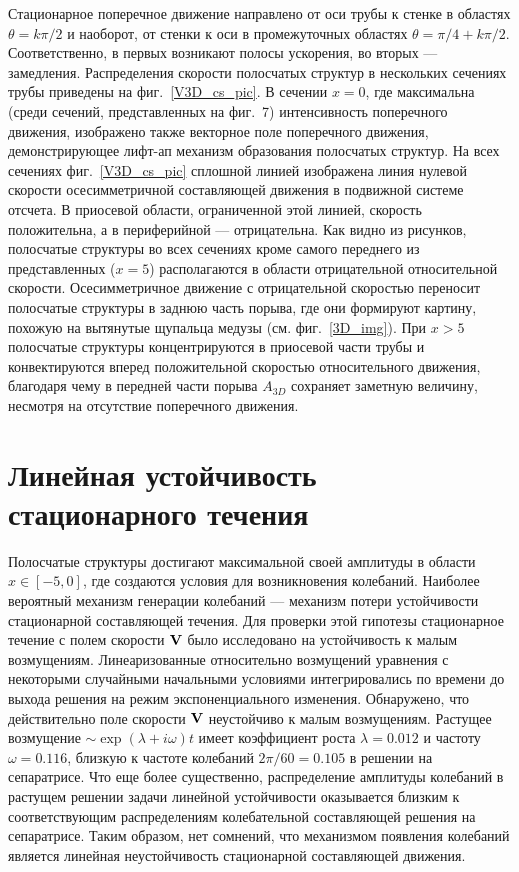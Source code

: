 Стационарное поперечное движение направлено от оси трубы к стенке в областях $\theta=k\pi/2$ и наоборот, от стенки к оси в промежуточных областях $\theta=\pi/4+k\pi/2$. Соответственно, в первых возникают полосы ускорения, во вторых --- замедления. Распределения скорости полосчатых структур в нескольких сечениях трубы приведены на фиг.~\ref{V3D_cs_pic}. В сечении $x=0$, где максимальна (среди сечений, представленных на фиг.~7) интенсивность поперечного движения, изображено также векторное поле поперечного движения, демонстрирующее лифт-ап механизм образования полосчатых структур. На всех сечениях фиг.~\ref{V3D_cs_pic} сплошной линией изображена линия нулевой скорости осесимметричной составляющей движения в подвижной системе отсчета. В приосевой области, ограниченной этой линией, скорость положительна, а в периферийной --- отрицательна. Как видно из рисунков, полосчатые структуры во всех сечениях кроме самого переднего из представленных ($x=5$) располагаются в области отрицательной относительной скорости. Осесимметричное движение с отрицательной скоростью переносит полосчатые структуры в заднюю часть порыва, где они формируют картину, похожую на вытянутые щупальца медузы (см. фиг.~\ref{3D_img}). При $x>5$ полосчатые структуры концентрируются в приосевой части трубы и конвектируются вперед положительной скоростью относительного движения, благодаря чему в передней части порыва $A_{3D}$ сохраняет заметную величину, несмотря на отсутствие поперечного движения.


\section{Линейная устойчивость стационарного течения}

Полосчатые структуры достигают максимальной своей амплитуды в области $x\in[-5,0]$, где создаются условия для возникновения колебаний. Наиболее вероятный механизм генерации колебаний --- механизм потери устойчивости стационарной составляющей течения. Для проверки этой гипотезы стационарное течение с полем скорости $\mathbf{V}$ было исследовано на устойчивость к малым возмущениям. Линеаризованные относительно возмущений уравнения с некоторыми случайными начальными условиями интегрировались по времени до выхода решения на режим экспоненциального изменения. Обнаружено, что действительно поле скорости $\mathbf{V}$ неустойчиво к малым возмущениям. Растущее возмущение $\sim\exp(\lambda+i\omega)t$ имеет коэффициент роста $\lambda=0.012$ и частоту $\omega=0.116$, близкую к частоте колебаний $2\pi/60=0.105$ в решении на сепаратрисе. Что еще более существенно, распределение амплитуды колебаний в растущем решении задачи линейной устойчивости оказывается близким к соответствующим распределениям колебательной составляющей решения на сепаратрисе. Таким образом, нет сомнений, что механизмом появления колебаний является линейная неустойчивость стационарной составляющей движения.


